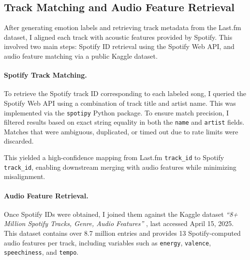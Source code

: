 \documentclass{article}
\begin{document}
\subsection{Track Matching and Audio Feature Retrieval}

After generating emotion labels and retrieving track metadata from the Last.fm dataset, I aligned each track with acoustic features provided by Spotify. This involved two main steps: Spotify ID retrieval using the Spotify Web API, and audio feature matching via a public Kaggle dataset.

\paragraph{Spotify Track Matching.}

To retrieve the Spotify track ID corresponding to each labeled song, I queried the Spotify Web API \parencite{SpotifyAPI} using a combination of track title and artist name. This was implemented via the \texttt{spotipy} Python package. To ensure match precision, I filtered results based on exact string equality in both the \texttt{name} and \texttt{artist} fields. Matches that were ambiguous, duplicated, or timed out due to rate limits were discarded.

This yielded a high-confidence mapping from Last.fm \texttt{track\_id} to Spotify \texttt{track\_id}, enabling downstream merging with audio features while minimizing misalignment.

\paragraph{Audio Feature Retrieval.}

Once Spotify IDs were obtained, I joined them against the Kaggle dataset \textit{“8+ Million Spotify Tracks, Genre, Audio Features”} \parencite{GrosseMalte2022}, last accessed April 15, 2025. This dataset contains over 8.7 million entries and provides 13 Spotify-computed audio features per track, including variables such as \texttt{energy}, \texttt{valence}, \texttt{speechiness}, and \texttt{tempo}.
\end{document}
